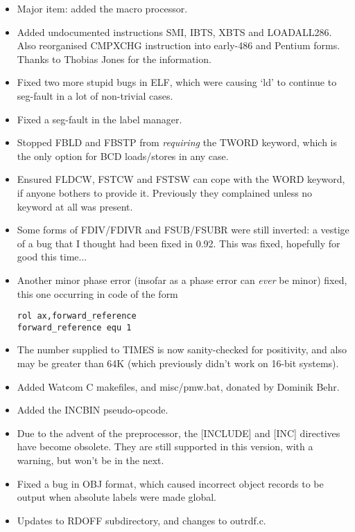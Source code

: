 \begin{itemize}
    \item{Major item: added the macro processor.}
    \item{Added undocumented instructions SMI, IBTS, XBTS and LOADALL286. Also
        reorganised CMPXCHG instruction into early-486 and Pentium forms.
        Thanks to Thobias Jones for the information.}
    \item{Fixed two more stupid bugs in ELF, which were causing `ld' to
        continue to seg-fault in a lot of non-trivial cases.}
    \item{Fixed a seg-fault in the label manager.}
    \item{Stopped FBLD and FBSTP from \emph{requiring} the TWORD keyword, which is
        the only option for BCD loads/stores in any case.}
    \item{Ensured FLDCW, FSTCW and FSTSW can cope with the WORD keyword, if
        anyone bothers to provide it. Previously they complained unless no
        keyword at all was present.}
    \item{Some forms of FDIV/FDIVR and FSUB/FSUBR were still inverted: a
        vestige of a bug that I thought had been fixed in 0.92. This was
        fixed, hopefully for good this time...}
    \item{Another minor phase error (insofar as a phase error can \emph{ever} be
        minor) fixed, this one occurring in code of the form
\begin{lstlisting}
rol ax,forward_reference
forward_reference equ 1
\end{lstlisting}}
    \item{The number supplied to TIMES is now sanity-checked for positivity,
        and also may be greater than 64K (which previously didn't work on
        16-bit systems).}
    \item{Added Watcom C makefiles, and misc/pmw.bat, donated by Dominik Behr.}
    \item{Added the INCBIN pseudo-opcode.}
    \item{Due to the advent of the preprocessor, the [INCLUDE] and [INC]
        directives have become obsolete. They are still supported in this
        version, with a warning, but won't be in the next.}
    \item{Fixed a bug in OBJ format, which caused incorrect object records to
        be output when absolute labels were made global.}
    \item{Updates to RDOFF subdirectory, and changes to outrdf.c.}
\end{itemize}

